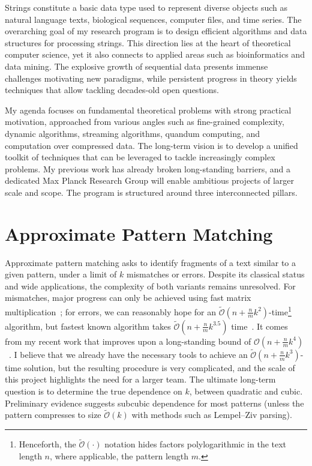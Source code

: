 \documentclass[a4paper,11pt]{article}
\newcommand{\Oh}{\mathcal{O}}
\newcommand{\Ohtilde}{\tilde{\mathcal{O}}}
\begin{document}
\thispagestyle{firststyle}

Strings constitute a basic data type used to represent diverse objects such as natural language texts, biological sequences, computer files, and time series. 
The overarching goal of my research program is to design efficient algorithms and data structures for processing strings. 
This direction lies at the heart of theoretical computer science, yet it also connects to applied areas such as bioinformatics and data mining. 
The explosive growth of sequential data presents immense challenges motivating new paradigms, while persistent progress in theory yields techniques that allow tackling decades-old open questions.

My agenda focuses on fundamental theoretical problems with strong practical motivation, approached from various angles such as fine-grained complexity, dynamic algorithms, streaming algorithms, quandum computing, and computation over compressed data. 
The long-term vision is to develop a unified toolkit of techniques that can be leveraged to tackle increasingly complex problems. 
My previous work has already broken long-standing barriers, and a dedicated Max Planck Research Group will enable ambitious projects of larger scale and scope. 
The program is structured around three interconnected pillars.

\section{Approximate Pattern Matching}

Approximate pattern matching asks to identify fragments of a text similar to a given pattern, under a limit of $k$ mismatches or errors. 
Despite its classical status and wide applications, the complexity of both variants remains unresolved. 
For mismatches, major progress can only be achieved using fast matrix multiplication~\cite{GU18}; 
for errors, we can reasonably hope for an $\Ohtilde(n+\tfrac{n}{m}k^{2})$-time\footnote{Henceforth, the $\Ohtilde(\cdot)$ notation hides factors polylogarithmic in the text length $n$, where applicable, the pattern length $m$.} algorithm, but fastest known algorithm takes $\Ohtilde(n+\tfrac{n}{m}k^{3.5})$ time~\cite{CKW22}. 
It comes from my recent work that improves upon a long-standing bound of $\Oh(n+\tfrac{n}{m}k^4)$~\cite{CH98}.
I believe that we already have the necessary tools to achieve an $\Ohtilde(n+\tfrac{n}{m}k^{3})$-time solution, but the resulting procedure is very complicated, and the scale of this project highlights the need for a larger team. 
The ultimate long-term question is to determine the true dependence on $k$, between quadratic and cubic.
Preliminary evidence suggests subcubic dependence for most patterns (unless the pattern compresses to size $\Ohtilde(k)$ with methods such as Lempel--Ziv parsing).  
\end{document}
